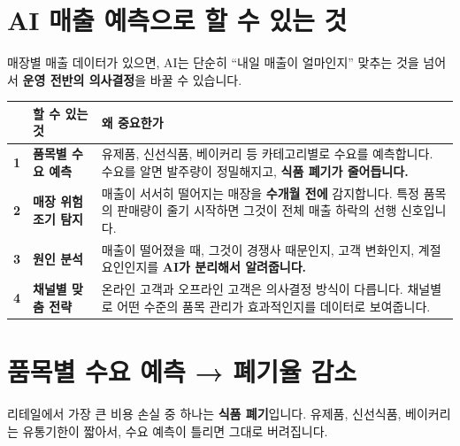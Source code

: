 \documentclass[11pt, a4paper]{article}
\begin{document}
\newpage

\section{AI 매출 예측으로 할 수 있는 것}

매장별 매출 데이터가 있으면, AI는 단순히 ``내일 매출이 얼마인지'' 맞추는 것을 넘어서 \textbf{운영 전반의 의사결정}을 바꿀 수 있습니다.

\vspace{0.5cm}

\begin{table}[H]
\centering
\renewcommand{\arraystretch}{1.5}
\begin{tabularx}{\textwidth}{C{0.8cm} L{5cm} X}
\toprule
{} & \textbf{할 수 있는 것} & \textbf{왜 중요한가} \\
\midrule
\textbf{1} & \textbf{품목별 수요 예측} & 유제품, 신선식품, 베이커리 등 카테고리별로 수요를 예측합니다. 수요를 알면 발주량이 정밀해지고, \textbf{식품 폐기가 줄어듭니다.} \\[6pt]
\textbf{2} & \textbf{매장 위험 조기 탐지} & 매출이 서서히 떨어지는 매장을 \textbf{수개월 전에} 감지합니다. 특정 품목의 판매량이 줄기 시작하면 그것이 전체 매출 하락의 선행 신호입니다. \\[6pt]
\textbf{3} & \textbf{원인 분석} & 매출이 떨어졌을 때, 그것이 경쟁사 때문인지, 고객 변화인지, 계절 요인인지를 \textbf{AI가 분리해서 알려줍니다.} \\[6pt]
\textbf{4} & \textbf{채널별 맞춤 전략} & 온라인 고객과 오프라인 고객은 의사결정 방식이 다릅니다. 채널별로 어떤 수준의 품목 관리가 효과적인지를 데이터로 보여줍니다. \\
\bottomrule
\end{tabularx}
\end{table}

\newpage

\section{품목별 수요 예측 → 폐기율 감소}

리테일에서 가장 큰 비용 손실 중 하나는 \textbf{식품 폐기}입니다. 유제품, 신선식품, 베이커리는 유통기한이 짧아서, 수요 예측이 틀리면 그대로 버려집니다.
\end{document}

